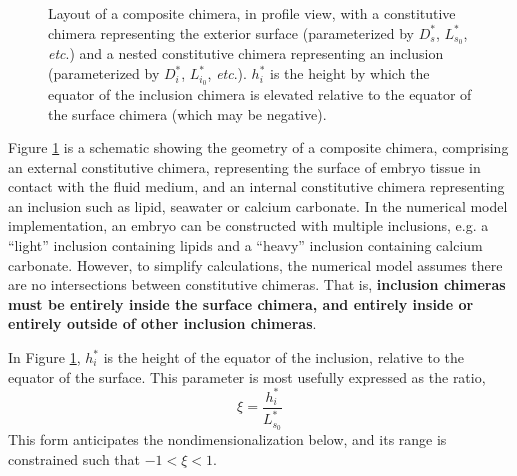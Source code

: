 \documentclass[10pt,a4paper]{article}
\def\etc{\emph{etc}.\xspace}
\begin{document}
\begin{figure}[t]
\begin{center}
{\begin{tikzpicture}
			\end{tikzpicture}
		}
	\end{center}
	\caption{Layout of a composite chimera, in profile view, with a constitutive chimera representing the exterior surface (parameterized by $D_s^*$, $L^*_{s_0}$, \etc) and a nested constitutive chimera representing an inclusion (parameterized by $D_i^*$, $L^*_{i_0}$, \etc). 
	$h_i^*$ is the height by which the equator of the inclusion chimera is elevated relative to the equator of the surface chimera (which may be negative). 
	} \label{fig:chimera2}
\end{figure}
\noindent
Figure \ref{fig:chimera2} is a schematic showing the geometry of a composite chimera, comprising an external constitutive chimera, representing the surface of embryo tissue in contact with the fluid medium, and an internal constitutive chimera representing an inclusion such as lipid, seawater or calcium carbonate.
In the numerical model implementation, an embryo can be constructed with multiple inclusions, e.g. a ``light'' inclusion containing lipids and a ``heavy'' inclusion containing calcium carbonate.
However, to simplify calculations, the numerical model assumes there are no intersections between constitutive chimeras.
That is, \textbf{inclusion chimeras must be entirely inside the surface chimera, and entirely inside or entirely outside of other inclusion chimeras}.

In Figure \ref{fig:chimera2}, $h_i^*$ is the height of the equator of the inclusion, relative to the equator of the surface. 
This parameter is most usefully expressed as the ratio, 
\begin{equation}\label{phi_eq}
	\xi = \frac{h_i^*}{L_{s_0}^*}
\end{equation}
This form anticipates the nondimensionalization below, and its range is constrained such that $-1 < \xi < 1$.
\end{document}
